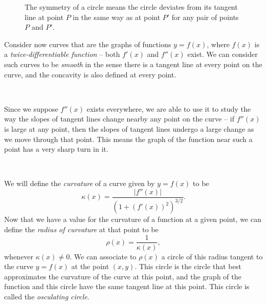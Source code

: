 \documentclass{exam}
\newcommand\rightAngle[4]{
  \pgfmathanglebetweenpoints{\pgfpointanchor{#2}{center}}{\pgfpointanchor{#3}{center}}
  \coordinate (tmpRA) at ($(#2)+(\pgfmathresult+45:#4)$);
  \draw[blue!40!black] ($(#2)!(tmpRA)!(#1)$) -- (tmpRA) -- ($(#2)!(tmpRA)!(#3)$);
}
\begin{document}
\begin{figure}[h]
\begin{center}
\caption{The symmetry of a circle means the circle deviates from its tangent line at point $P$ in the same way as at point $P'$ for any pair of points $P$ and $P'$.}
\end{center}
\end{figure}

Consider now curves that are the graphs of functions $y=f(x)$, where $f(x)$ is a \textit{twice-differentiable function} -- both $f'(x)$ and $f''(x)$ exist. We can consider such curves to be \textit{smooth} in the sense there is a tangent line at every point on the curve, and the concavity is also defined at every point. 

\

Since we suppose $f''(x)$ exists everywhere, we are able to use it to study the way the slopes of tangent lines change nearby any point on the curve -- if $f''(x)$ is large at any point, then the slopes of tangent lines undergo a large change as we move through that point. This means the graph of the function near such a point has a very sharp turn in it. 

\

We will define the \textit{curvature} of a curve given by $y=f(x)$ to be 
$$
\kappa(x) = \frac{|f''(x)|}{\left(1+(f'(x))^2\right)^{3/2}}.
$$
Now that we have a value for the curvature of a function at a given point, we can define the \textit{radius of curvature} at that point to be \[\rho(x)=\frac{1}{\kappa(x)},\] whenever $\kappa(x)\neq 0.$ We can associate to $\rho(x)$ a circle of this radius tangent to the curve $y=f(x)$ at the point $(x,y)$.  This circle is the circle that best approximates the curvature of the curve at this point, and the graph of the function and this circle have the same tangent line at this point. This circle is called the \textit{osculating circle}.
\end{document}
